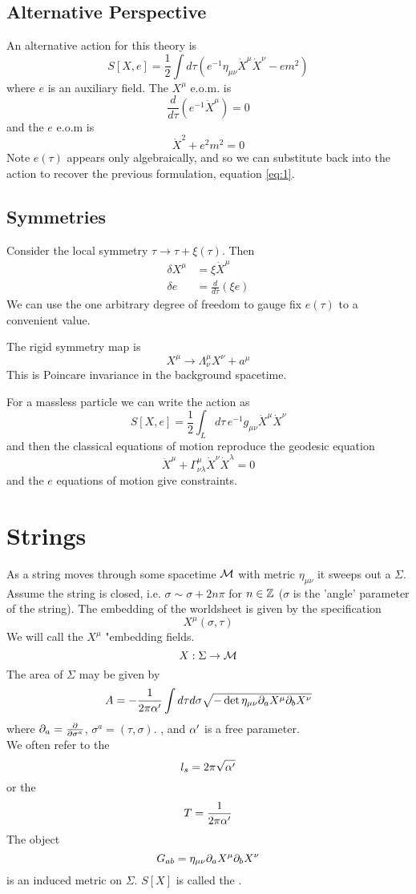 \documentclass{article}
\begin{document}
\subsection{Alternative Perspective}
An alternative action for this theory is 
\[
S[X,e]=\frac{1}{2} \int d\tau (e^{-1} \eta_{\mu\nu} \dot{X}^\mu \dot{X}^\nu - em^2 )
\]
where $e$ is an auxiliary field. The $X^\mu$ e.o.m. is 
\[
\frac{d}{d\tau}(e^{-1} \dot{X}^\mu ) = 0 
\]
and the $e$ e.o.m is 
\[
\dot{X}^2 + e^2m^2=0
\]
Note $e(\tau)$ appears only algebraically, and so we can substitute back into the action to recover the previous formulation, equation \ref{eq:1}. \\

\subsection{Symmetries}
Consider the local symmetry $\tau \to \tau + \xi(\tau)$. Then 
\begin{align}
    \delta X^\mu &= \xi \dot{X}^\mu \\
    \delta e &= \frac{d}{d\tau}(\xi e) 
\end{align}
We can use the one arbitrary degree of freedom to gauge fix $e(\tau)$ to a convenient value. 

\begin{definition}
The rigid symmetry map is 
\[
X^\mu \to \Lambda^\mu_\nu X^\nu + a^\mu
\]
This is Poincare invariance in the background spacetime. \end{definition}
For a massless particle we can write the action as 
\[
S[X,e] = \frac{1}{2} \int_L d\tau \, e^{-1} g_{\mu\nu} \dot{X}^\mu \dot{X}^\nu
\]
and then the classical equations of motion reproduce the geodesic equation 
\[
\ddot{X}^\mu + \Gamma^{\mu}_{\nu\lambda} \dot{X}^\nu \dot{X}^\lambda = 0
\]
and the $e$ equations of motion give constraints. 

\section{Strings}
As a string moves through some spacetime $\mathcal{M}$ with metric $\eta_{\mu\nu}$ it sweeps out a  $\Sigma$. Assume the string is closed, i.e. $\sigma \sim \sigma+2n\pi$ for $n\in\mathbb{Z}$ ($\sigma$ is the 'angle' parameter of the string). The embedding of the worldsheet is given by the specification 
\[
X^\mu (\sigma,\tau)
\]
We will call the $X^\mu$ "embedding fields. 
\[
X : \Sigma \to \mathcal{M}
\]
The area of $\Sigma$ may be given by 
\[
A = -\frac{1}{2\pi \alpha^\prime} \int d\tau d\sigma \sqrt{-\det{\eta_{\mu\nu}\partial_a X^\mu \partial_b X^\nu}}
\]
where $\partial_a = \frac{\partial}{\partial\sigma^a}$, $\sigma^a = (\tau, \sigma)$. , and $\alpha^\prime$ is a free parameter. \\
We often refer to the  
\[
l_s = 2 \pi \sqrt{\alpha^\prime}
\]
or the  
\[
T = \frac{1}{2\pi \alpha^\prime}
\]
The object 
\[
G_{ab} = \eta_{\mu\nu}\partial_a X^\mu \partial_b X^\nu
\]
is an induced metric on $\Sigma$. $S[X]$ is called the .
\end{document}
